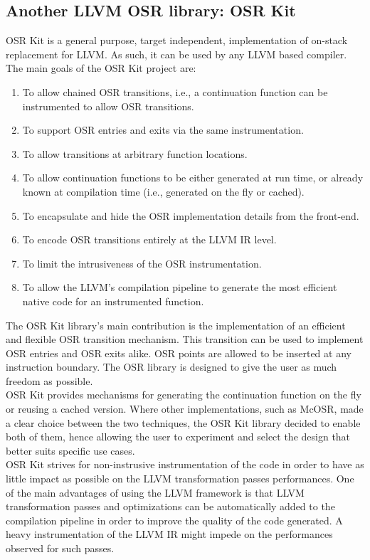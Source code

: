 \subsection{Another LLVM OSR library: OSR Kit}\label{describeOSRKit}
OSR Kit\cite{OSRKit} is a general purpose, target independent, implementation of on-stack replacement for LLVM.
As such, it can be used by any LLVM based compiler.
The main goals of the OSR Kit project are:
\begin{enumerate}
    \item To allow chained OSR transitions, i.e., a continuation function can be instrumented to allow OSR transitions.
    \item To support OSR entries and exits via the same instrumentation.
    \item To allow transitions at arbitrary function locations.
    \item To allow continuation functions to be either generated at run time, or already known at compilation time (i.e., generated on the fly or cached).
    \item To encapsulate and hide the OSR implementation details from the front-end.
    \item To encode OSR transitions entirely at the LLVM IR level.
    \item To limit the intrusiveness of the OSR instrumentation.
    \item To allow the LLVM's compilation pipeline to generate the most efficient native code for an instrumented function. \label{llvmTransformPasses}
\end{enumerate}

The OSR Kit library's main contribution is the implementation of an efficient and flexible OSR transition mechanism.
This transition can be used to implement OSR entries and OSR exits alike.
OSR points are allowed to be inserted at any instruction boundary. 
The OSR library is designed to give the user as much freedom as possible.\\

OSR Kit provides mechanisms for generating the continuation function on the fly or reusing a cached version.
Where other implementations, such as McOSR\cite{lameed2013modular}, made a clear choice between the two techniques, the OSR Kit library decided to enable both of them, hence allowing the user to experiment and select the design that better suits specific use cases.\\

OSR Kit strives for non-instrusive instrumentation of the code in order to have as little impact as possible on the LLVM transformation passes performances.
One of the main advantages of using the LLVM framework is that LLVM transformation passes and optimizations can be automatically added to the compilation pipeline in order to improve the quality of the code generated.
A heavy instrumentation of the LLVM IR might impede on the performances observed for such passes.\\

